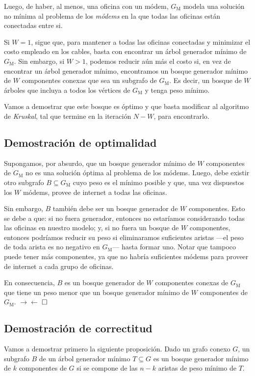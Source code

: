 Luego, de haber, al menos, una oficina con un módem, $G_{\text{M}}$ modela una solución no mínima al problema de los \textit{módems} en la que todas las oficinas están conectadas entre si. 

Si $W = 1$, sigue que, para mantener a todas las oficinas conectadas y minimizar el costo empleado en los cables, basta con encontrar un árbol generador mínimo de $G_{\text{M}}$. Sin embargo, si $W > 1$, podemos reducir aún más el costo si, en vez de encontrar un árbol generador mínimo, encontramos un bosque generador mínimo de $W$ componentes conexas que sea un subgrafo de $G_{\text{M}}$. Es decir, un bosque de $W$ árboles que incluya a todos los vértices de $G_{\text{M}}$ y tenga peso mínimo.

Vamos a demostrar que este bosque es óptimo y que basta modificar al algoritmo de \textit{Kruskal}, tal que termine en la iteración $N-W$, para encontrarlo.

\subsection{Demostración de optimalidad}

Supongamos, por absurdo, que un bosque generador mínimo de $W$ componentes de $G_{\text{M}}$ no es una solución óptima al problema de los módems. Luego, debe existir otro subgrafo $B \subseteq G_{\text{M}}$ cuyo peso es el mínimo posible y que, una vez dispuestos los $W$ módems, provee de internet a todas las oficinas. 

Sin embargo, $B$ también debe ser un bosque generador de $W$ componentes. Esto se debe a que: si no fuera generador, entonces no estaríamos considerando todas las oficinas en nuestro modelo; y, si no fuera un bosque de $W$ componentes, entonces podríamos reducir su peso si eliminaramos suficientes aristas ---el peso de toda arista es no negativo en $G_{\text{M}}$--- hasta formar uno. Notar que tampoco puede tener más componentes, ya que no habría suficientes módems para proveer de internet a cada grupo de oficinas. 

En consecuencia, $B$ es un bosque generador de $W$ componentes conexas de $G_{\text{M}}$ que tiene un peso menor que un bosque generador mínimo de $W$ componentes  de $G_{\text{M}}$. $\rightarrow\leftarrow$ $\hfill \square$

\subsection{Demostración de correctitud}\label{correctitud} Vamos a demostrar primero la siguiente proposición. Dado un grafo conexo $G$, un subgrafo $B$ de un árbol generador mínimo $T \subseteq G$ es un bosque generador mínimo de $k$ componentes de $G$ si se compone de las $n - k$ aristas de peso mínimo de $T$.


